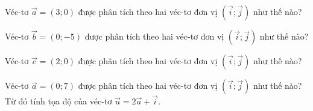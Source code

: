 \begin{bt}%
	Véc-tơ $\overrightarrow{a}=(3;0)$ được phân tích theo hai véc-tơ đơn vị $\left(\overrightarrow{i};\overrightarrow{j}\right)$ như thế nào?
\end{bt}

\begin{bt}%
	Véc-tơ $\overrightarrow{b}=(0;-5)$ được phân tích theo hai véc-tơ đơn vị $\left(\overrightarrow{i};\overrightarrow{j}\right)$ như thế nào?
\end{bt}

\begin{bt}%
	Véc-tơ $\overrightarrow{c}=(2;0)$ được phân tích theo hai véc-tơ đơn vị $\left(\overrightarrow{i};\overrightarrow{j}\right)$ như thế nào?
\end{bt}

\begin{bt}%
	Véc-tơ $\overrightarrow{a}=(0;7)$ được phân tích theo hai véc-tơ đơn vị $\left(\overrightarrow{i};\overrightarrow{j}\right)$ như thế nào? Từ đó tính tọa độ của véc-tơ $\overrightarrow{u}=2\overrightarrow{a}+\overrightarrow{i}$.
\end{bt}

